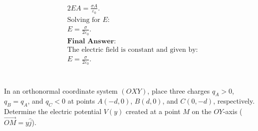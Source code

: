 \documentclass[12pt]{article}
\begin{document}
\begin{correctionbox}
\begin{align*}
		 & 2EA = \frac{\sigma A}{\varepsilon_0}.
		\\
		 & \text{Solving for } E:                                                                                \\
		 & E = \frac{\sigma}{2 \varepsilon_0}.
		\\
		 & \textbf{Final Answer:}                                                                                \\
		 & \text{The electric field is constant and given by:}                                                   \\
		 & E = \frac{\sigma}{2 \varepsilon_0}.
	\end{align*}
\end{correctionbox}

\section{}
In an orthonormal coordinate system $ (OXY) $, place three charges $ q_A > 0 $, $ q_B = q_A $, and $ q_C < 0 $ at points $ A(-d, 0) $, $ B(d, 0) $, and $ C(0, -d) $, respectively. Determine the electric potential $ V(y) $ created at a point $ M $ on the $ OY $-axis ($ \vec{OM} = y\hat{j} $).
\end{document}
